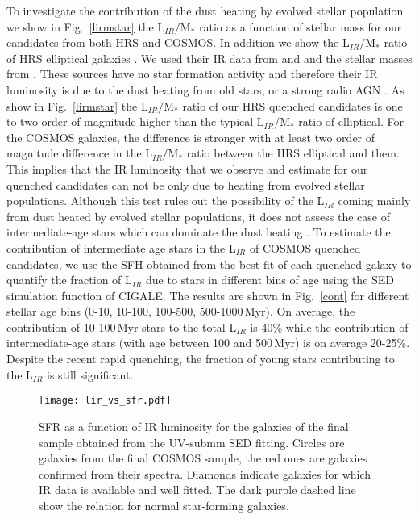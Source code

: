 \documentclass[traditabstract]{aa} %
\begin{document}
To investigate the contribution of the dust heating by evolved stellar population we show in Fig.~\ref{lirmstar} the L$_{IR}/$M$_*$ ratio as a function of stellar mass for our candidates from both HRS and COSMOS.
In addition we show the L$_{IR}/$M$_*$ ratio of HRS elliptical galaxies \citep[see][for the morphology details]{Boselli10b}.
We used their IR data from \cite{Smith12} and \cite{Ciesla12} and the stellar masses from \cite{Boselli10b}.
These sources have no star formation activity and therefore their IR luminosity is due to the dust heating from old stars, or a strong radio AGN \citep{Smith12,Ciesla12,Gomez10,Boselli10a}.
As show in Fig.~\ref{lirmstar} the L$_{IR}/$M$_*$ ratio of our HRS quenched candidates is one to two order of magnitude higher than the typical L$_{IR}/$M$_*$ ratio of elliptical.
For the COSMOS galaxies, the difference is stronger with at least two order of magnitude difference in the L$_{IR}/$M$_*$ ratio between the HRS elliptical and them.
This implies that the IR luminosity that we observe and estimate for our quenched candidates can not be only due to heating from evolved stellar populations.
Although this test rules out the possibility of the L$_{IR}$ coming mainly from dust heated by evolved stellar populations, it does not assess the case of intermediate-age stars which can dominate the dust heating \citep[see e.g.,][]{Utomo14,Hayward14}. 
To estimate the contribution of intermediate age stars in the L$_{IR}$ of COSMOS quenched candidates, we use the SFH obtained from the best fit of each quenched galaxy to quantify the fraction of L$_{IR}$ due to stars in different bins of age using the SED simulation function of CIGALE. 
The results are shown in Fig.~\ref{cont} for different stellar age bins (0-10, 10-100, 100-500, 500-1000\,Myr).
On average, the contribution of 10-100\,Myr stars to the total L$_{IR}$ is 40\% while the contribution of intermediate-age stars (with age between 100 and 500\,Myr) is on average 20-25\%. 
Despite the recent rapid quenching, the fraction of young stars contributing to the L$_{IR}$ is still significant. 

\begin{figure}[!h] 
  	\texttt{[image: lir\_vs\_sfr.pdf]}
  	\caption{\label{lirsfr} SFR as a function of IR luminosity for the galaxies of the final sample obtained from the UV-submm SED fitting. Circles are galaxies from the final COSMOS sample, the red ones are galaxies confirmed from their spectra. Diamonds indicate galaxies for which IR data is available and well fitted. The dark purple dashed line show the \cite{KennicuttEvans12} relation for normal star-forming galaxies.}
\end{figure}
\end{document}
